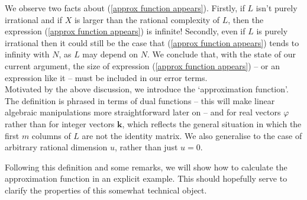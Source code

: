 \documentclass[12pt,a4paper,twoside,reqno]{amsart}
\numberwithin{equation}{section}
\begin{document}
We observe two facts about (\ref{approx function appears}). Firstly, if $L$ isn't purely irrational and if $X$ is larger than the rational complexity of $L$, then the expression (\ref{approx function appears}) is infinite! Secondly, even if $L$ is purely irrational then it could still be the case that (\ref{approx function appears}) tends to infinity with $N$, as $L$ may depend on $N$. We conclude that, with the state of our current argument, the size of expression (\ref{approx function appears}) -- or an expression like it -- must be included in our error terms. \\


Motivated by the above discussion, we introduce the `approximation function'. The definition is phrased in terms of dual functions -- this will make linear algebraic manipulations more straightforward later on -- and for real vectors $\varphi$ rather than for integer vectors $\mathbf{k}$, which reflects the general situation in which the first $m$ columns of $L$ are not the identity matrix. We also generalise to the case of arbitrary rational dimension $u$, rather than just $u=0$. 

 Following this definition and some remarks, we will show how to calculate the approximation function in an explicit example. This should hopefully serve to clarify the properties of this somewhat technical object. 
\end{document}

